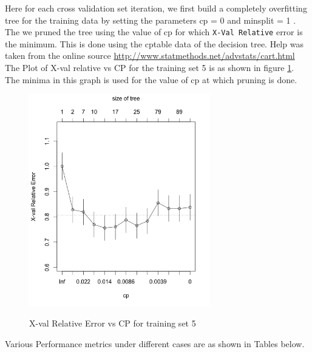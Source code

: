 \documentclass[12pt]{article}%
\begin{document}
Here for each cross validation set iteration, we first build a completely overfitting tree for the training data by setting the parameters cp = 0 and minsplit = 1 .\\
The we pruned the tree using the value of cp for which {\tt X-Val Relative} error is the minimum. This is done using the cptable data of the decision tree. Help was taken from the online source \url{http://www.statmethods.net/advstats/cart.html} \\
The Plot of X-val relative vs CP for the training set 5 is as shown in figure \ref{fig:xvalvscp}. The minima in this graph is used for the value of cp at which pruning is done. \\
\begin{figure}[h!]

  \caption{X-val Relative Error vs CP for training set 5}
  \centering
    \includegraphics[width=0.7\textwidth]{xval_vs_cp_5}
    \label{fig:xvalvscp}
\end{figure}
 
Various Performance metrics under different cases are as shown in Tables below.
 
\end{document}
